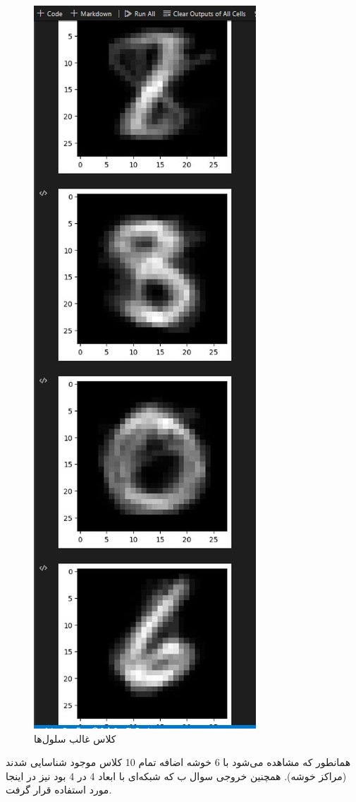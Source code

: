 \documentclass{article}
\begin{document}
\begin{figure}[!h]
    \centering\includegraphics[scale=.65]{./p6-6}
    \caption{کلاس غالب سلول‌ها}\label{fig.66}
\end{figure}

\cleardoublepage

همانطور که مشاهده می‌شود با 6 خوشه اضافه تمام 10 کلاس موجود شناسایی شدند (مراکز خوشه).
همچنین خروجی سوال ب که شبکه‌ای با ابعاد 4 در 4 بود نیز در اینجا مورد استفاده قرار گرفت.


\end{document}
